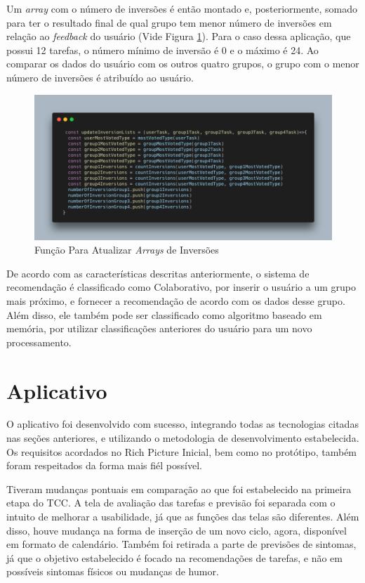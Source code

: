 Um \emph{array} com o número de inversões é então montado e, posteriormente, somado para ter o resultado final de qual grupo tem menor número de 
inversões em relação ao \emph{feedback} do usuário (Vide Figura \ref{fig17}). 
Para o caso dessa aplicação, que possui 12 tarefas, o número mínimo de inversão é 0 e o máximo é 24. Ao comparar os dados do usuário 
com os outros quatro grupos, o grupo com o menor número de inversões é atribuído ao usuário. 

\begin{figure}[ht]
	\caption{Função Para Atualizar \emph{Arrays} de Inversões}
	\begin{center}
	\includegraphics[keepaspectratio=true,scale=0.35]{figuras/code-updateInversionLists.png}
	\end{center}
    \label{fig17}
\end{figure}

De acordo com as características descritas anteriormente, o sistema de recomendação é classificado como Colaborativo, por inserir o usuário a 
um grupo mais próximo, e fornecer a recomendação de acordo com os dados desse grupo. Além disso, ele também pode ser classificado como 
algoritmo baseado em memória, por utilizar classificações anteriores do usuário para um novo processamento.


\section{Aplicativo}

O aplicativo foi desenvolvido com sucesso, integrando todas as tecnologias citadas nas seções anteriores, e 
utilizando o metodologia de desenvolvimento estabelecida. Os requisitos acordados no Rich Picture Inicial, bem como no protótipo, também foram respeitados da forma
mais fiél possível.

Tiveram mudanças pontuais em comparação ao que foi estabelecido na primeira etapa do TCC. A tela de avaliação das tarefas e 
previsão foi separada com o intuito de melhorar a usabilidade, já que as funções das telas são diferentes.
Além disso, houve mudança na forma de inserção de um novo ciclo, agora, disponível em formato de calendário. 
Também foi retirada a parte de previsões de sintomas, já que o objetivo estabelecido é focado na recomendações de 
tarefas, e não em possíveis sintomas físicos ou mudanças de humor.

